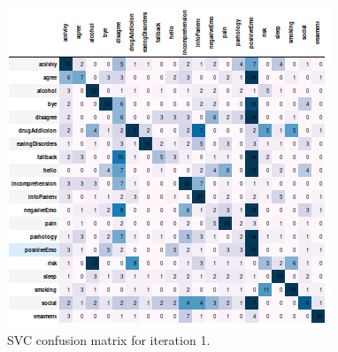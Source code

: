 \documentclass[11pt]{article}
\begin{document}
\begin{figure}[h]
	\centering
	\includegraphics[scale=0.7]{lsvc_1.png}
	\caption{SVC confusion matrix for iteration 1.}
\label{lsvc_cm_1}
\end{figure}
\FloatBarrier
\end{document}
